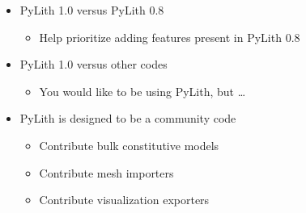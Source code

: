 \documentclass[pdftex,cig,slideColor]{pp4slides}
\begin{document}

  \begin{itemize}
  \item PyLith 1.0 versus PyLith 0.8
    \begin{itemize}
    \item Help prioritize adding features present in PyLith 0.8
    \end{itemize}
  \item PyLith 1.0 versus other codes
    \begin{itemize}
    \item You would like to be using PyLith, but \ldots
    \end{itemize}
  \item PyLith is designed to be a community code
    \begin{itemize}
    \item Contribute bulk constitutive models
    \item Contribute mesh importers
    \item Contribute visualization exporters
    \end{itemize}
  \end{itemize}


\end{document}
